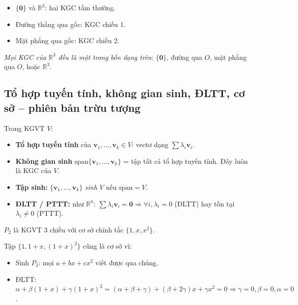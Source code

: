 \documentclass[12pt,a4paper]{article}
\begin{document}
\begin{vidu}[title={KGC trong $\mathbb{R}^3$}]
\begin{itemize}
  \item $\{\mathbf{0}\}$ và $\mathbb{R}^3$: hai KGC tầm thường.
  \item Đường thẳng qua gốc: KGC chiều 1.
  \item Mặt phẳng qua gốc: KGC chiều 2.
\end{itemize}
\emph{Mọi KGC của $\mathbb{R}^3$ đều là một trong bốn dạng trên}: $\{\mathbf{0}\}$, đường qua $O$, mặt phẳng qua $O$, hoặc $\mathbb{R}^3$.
\end{vidu}

\subsection{Tổ hợp tuyến tính, không gian sinh, ĐLTT, cơ sở -- phiên bản trừu tượng}

\begin{dinhnghia}
  Trong KGVT $V$:
  \begin{itemize}
    \item \textbf{Tổ hợp tuyến tính} của $\mathbf{v}_1, \ldots, \mathbf{v}_k \in V$: vectơ dạng $\sum \lambda_i \mathbf{v}_i$.
    \item \textbf{Không gian sinh} $\mathrm{span}\{\mathbf{v}_1, \ldots, \mathbf{v}_k\}$ = tập tất cả tổ hợp tuyến tính. Đây luôn là KGC của $V$.
    \item \textbf{Tập sinh:} $\{\mathbf{v}_1, \ldots, \mathbf{v}_k\}$ \emph{sinh} $V$ nếu $\mathrm{span} = V$.
    \item \textbf{ĐLTT / PTTT:} như $\mathbb{R}^n$: $\sum \lambda_i \mathbf{v}_i = \mathbf{0} \Rightarrow \forall i, \lambda_i = 0$ (ĐLTT) hay tồn tại $\lambda_i \ne 0$ (PTTT).
  \end{itemize}
\end{dinhnghia}

\begin{vidu}[title={Trong $P_2(\mathbb{R})$}]
$P_2$ là KGVT 3 chiều với cơ sở chính tắc $\{1, x, x^2\}$.

Tập $\{1, 1 + x, (1+x)^2\}$ cũng là cơ sở vì:
\begin{itemize}
  \item Sinh $P_2$: mọi $a + bx + cx^2$ viết được qua chúng.
  \item ĐLTT: $\alpha + \beta(1+x) + \gamma(1+x)^2 = (\alpha+\beta+\gamma) + (\beta + 2\gamma)x + \gamma x^2 = 0 \Rightarrow \gamma = 0, \beta = 0, \alpha = 0$.
\end{itemize}
\end{vidu}
\end{document}
